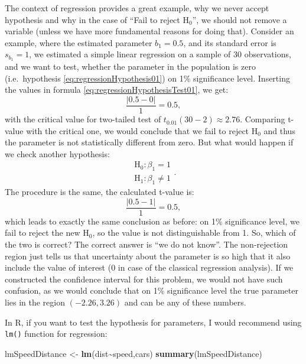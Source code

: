 \documentclass[
]{book}
\newenvironment{Shaded}{\begin{snugshade}}{\end{snugshade}}
\newcommand{\KeywordTok}[1]{\textcolor[rgb]{0.13,0.29,0.53}{\textbf{#1}}}
\newcommand{\NormalTok}[1]{#1}
\newcommand{\OperatorTok}[1]{\textcolor[rgb]{0.81,0.36,0.00}{\textbf{#1}}}
\newcommand{\StringTok}[1]{\textcolor[rgb]{0.31,0.60,0.02}{#1}}
\theoremstyle{definition}
\theoremstyle{definition}
\theoremstyle{definition}
\theoremstyle{definition}
\theoremstyle{remark}
\begin{document}
The context of regression provides a great example, why we never accept hypothesis and why in the case of ``Fail to reject H\(_0\)'', we should not remove a variable (unless we have more fundamental reasons for doing that). Consider an example, where the estimated parameter \(b_1=0.5\), and its standard error is \(s_{b_1}=1\), we estimated a simple linear regression on a sample of 30 observations, and we want to test, whether the parameter in the population is zero (i.e.~hypothesis \eqref{eq:regressionHypothesis01}) on 1\% significance level. Inserting the values in formula \eqref{eq:regressionHypothesisTest01}, we get:
\begin{equation*}
    \frac{|0.5 - 0|}{1} = 0.5,
\end{equation*}
with the critical value for two-tailed test of \(t_{0.01}(30-2)\approx 2.76\). Comparing t-value with the critical one, we would conclude that we fail to reject H\(_0\) and thus the parameter is not statistically different from zero. But what would happen if we check another hypothesis:
\begin{equation*}
    \begin{aligned}
        \mathrm{H}_0: \beta_1 = 1 \\
        \mathrm{H}_1: \beta_1 \neq 1
    \end{aligned} .
\end{equation*}
The procedure is the same, the calculated t-value is:
\begin{equation*}
    \frac{|0.5 - 1|}{1} = 0.5,
\end{equation*}
which leads to exactly the same conclusion as before: on 1\% significance level, we fail to reject the new H\(_0\), so the value is not distinguishable from 1. So, which of the two is correct? The correct answer is ``we do not know''. The non-rejection region just tells us that uncertainty about the parameter is so high that it also include the value of interest (0 in case of the classical regression analysis). If we constructed the confidence interval for this problem, we would not have such confusion, as we would conclude that on 1\% significance level the true parameter lies in the region \((-2.26, 3.26)\) and can be any of these numbers.

In R, if you want to test the hypothesis for parameters, I would recommend using \texttt{lm()} function for regression:

\begin{Shaded}
\begin{Highlighting}[]
\NormalTok{lmSpeedDistance \textless{}{-}}\StringTok{ }\KeywordTok{lm}\NormalTok{(dist}\OperatorTok{\textasciitilde{}}\NormalTok{speed,cars)}
\KeywordTok{summary}\NormalTok{(lmSpeedDistance)}
\end{Highlighting}
\end{Shaded}
\end{document}

